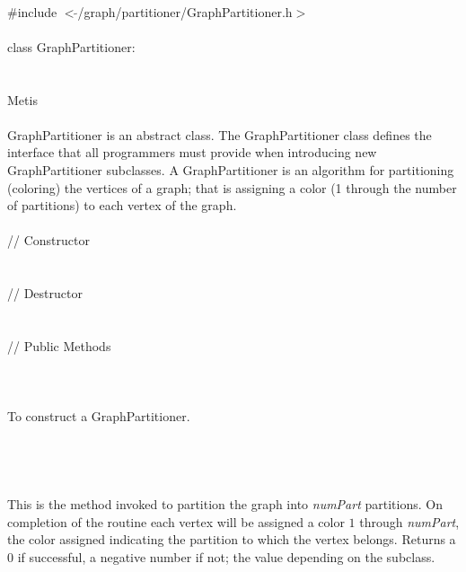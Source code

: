 
   \\
\indent \#include $<\tilde{ }$/graph/partitioner/GraphPartitioner.h$>$  \\

  \\
\indent class GraphPartitioner:  \\

 \\
 \\
\indent\indent Metis \\

  \\
\indent GraphPartitioner is an abstract class. The GraphPartitioner
class defines the interface that all programmers must provide when
introducing new GraphPartitioner subclasses. A GraphPartitioner is an
algorithm for partitioning (coloring) the vertices of a graph; that is
assigning a color (1 through the number of partitions) to each vertex
of the graph. \\

  \\
\indent\indent // Constructor \\
\indent{}  \\ \\
\indent\indent // Destructor  \\
\indent{}  \\ \\
\indent\indent // Public Methods  \\
\indent{} \\

  \\
  \\
To construct a GraphPartitioner. \\

  \\
  \\

  \\
 \\
This is the method invoked to partition the graph into {\em numPart}
partitions. On completion of the routine each vertex will be assigned
a color $1$ through {\em numPart}, the color assigned indicating the
partition to which the vertex belongs. Returns a $0$ if successful, a
negative number if not; the value depending on the subclass.  \\



